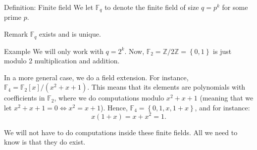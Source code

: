 \documentclass[a4paper]{article}
\begin{document}
\begin{parag}{Definition: Finite field}
    We let $\mathbb{F}_q$ to denote the finite field of size $q = p^k$ for some prime $p$.

    \begin{subparag}{Remark}
        $\mathbb{F}_q$ exists and is unique.
    \end{subparag}

    \begin{subparag}{Example}
        We will only work with $q = 2^k$. Now, $\mathbb{F}_2 = \mathbb{Z}/2\mathbb{Z} = \left\{0, 1\right\}$ is just modulo 2 multiplication and addition.

        In a more general case, we do a field extension. For instance, $\mathbb{F}_4 = \mathbb{F}_2\left[x\right] / \left(x^2 + x + 1\right)$. This means that its elements are polynomials with coefficients in $\mathbb{F}_2$, where we do computations modulo $x^2 + x + 1$ (meaning that we let $x^2 + x + 1 = 0 \iff x^2 = x + 1$). Hence, $\mathbb{F}_4 = \left\{0, 1, x, 1+x\right\}$, and for instance: 
        \[x \left(1 + x\right) = x + x^2 = 1.\]
        
        We will not have to do computations inside these finite fields. All we need to know is that they do exist.
    \end{subparag}
\end{parag}
\end{document}

